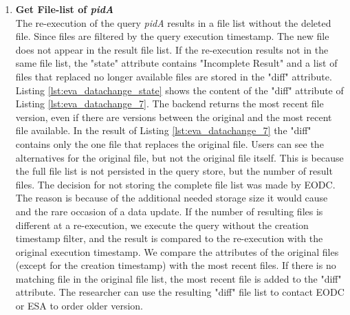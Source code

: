 \documentclass[draft,final]{vutinfth} %
\newcommand{\bgoesswein}[1]{{\color{blue}#1}}
\begin{document}
\begin{enumerate}
	\item \textbf{Get File-list of \textit{pidA}}\\ 
	The re-execution of the query \textit{pidA} results in a file list without the deleted file. Since files are filtered by the query execution timestamp. The new file does not appear in the result file list. \bgoesswein{If the re-execution results not in the same file list, the "state" attribute contains "Incomplete Result" and a list of files that replaced no longer available files are stored in the "diff" attribute.} Listing \ref{lst:eva_datachange_state} shows the content of the "diff" attribute of Listing \ref{lst:eva_datachange_7}. The backend returns the most recent file version, even if there are versions between the original and the most recent file available. In the result of Listing \ref{lst:eva_datachange_7} the "diff" contains only the one file that replaces the original file. Users can see the alternatives for the original file, but not the original file itself. This is because the full file list is not persisted in the query store, but the number of result files. The decision for not storing the complete file list was made by EODC. The reason is because of the additional needed storage size it would cause and the rare occasion of a data update. If the number of resulting files is different at a re-execution, we execute the query without the \bgoesswein{creation} timestamp filter, and the result is compared to the re-execution with the original execution timestamp. \bgoesswein{We compare the attributes of the original files (except for the creation timestamp) with the most recent files. If there is no matching file in the original file list, the most recent file is added to the "diff" attribute.} The researcher can use the resulting "diff" file list to contact EODC or ESA to order older version.

\end{enumerate}
\end{document}
